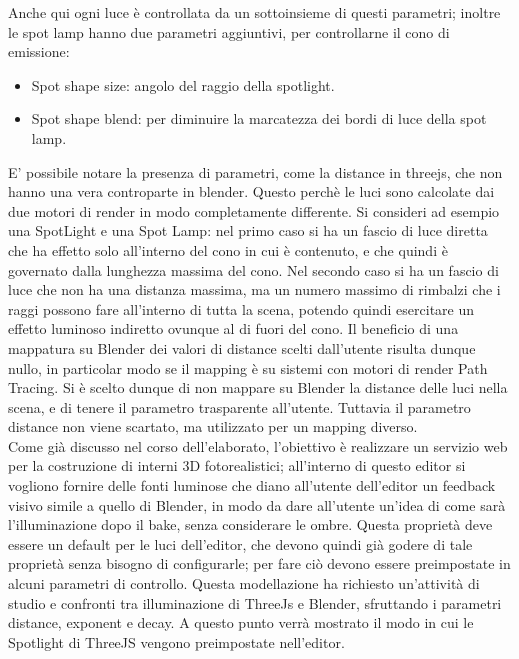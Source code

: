 Anche qui ogni luce è controllata da un sottoinsieme di questi parametri; inoltre le spot lamp hanno due parametri aggiuntivi, per controllarne il cono di emissione:
\begin{itemize}
\item Spot shape size: angolo del raggio della spotlight.
\item Spot shape blend: per diminuire la marcatezza dei bordi di luce della spot lamp.
\end{itemize}
E’ possibile notare la presenza di parametri, come la distance in threejs, che non hanno una vera controparte in blender. Questo perchè le luci sono calcolate dai due motori di render in modo completamente differente. Si consideri ad esempio una SpotLight e una Spot Lamp: nel primo caso si ha un fascio di luce diretta che ha effetto solo all’interno del cono in cui è contenuto, e che quindi è governato dalla lunghezza massima del cono. Nel secondo caso si ha un fascio di luce che non ha una distanza massima, ma un numero massimo di rimbalzi che i raggi possono fare all’interno di tutta la scena, potendo quindi esercitare un effetto luminoso indiretto ovunque al di fuori del cono. Il beneficio di una mappatura su Blender dei valori di distance scelti dall’utente risulta dunque nullo, in particolar modo se il mapping è su sistemi con motori di render Path Tracing. Si è scelto dunque di non mappare su Blender la distance delle luci nella scena, e di tenere il parametro trasparente all’utente. Tuttavia il parametro distance non viene scartato, ma utilizzato per un mapping diverso.
\\
Come già discusso nel corso dell’elaborato, l’obiettivo è realizzare un servizio web per la costruzione di interni 3D fotorealistici; all’interno di questo editor si vogliono fornire delle fonti luminose che diano all’utente dell’editor un feedback visivo simile a quello di Blender, in modo da dare all’utente un’idea di come sarà l’illuminazione dopo il bake, senza considerare le ombre. Questa proprietà deve essere un default per le luci dell’editor, che devono quindi già godere di tale proprietà senza bisogno di configurarle; per fare ciò devono essere preimpostate in alcuni parametri di controllo. Questa modellazione ha richiesto un’attività di studio e confronti tra illuminazione di ThreeJs e Blender, sfruttando i parametri distance, exponent e decay. A questo punto verrà mostrato il modo in cui le Spotlight di ThreeJS vengono preimpostate nell’editor.
\\
